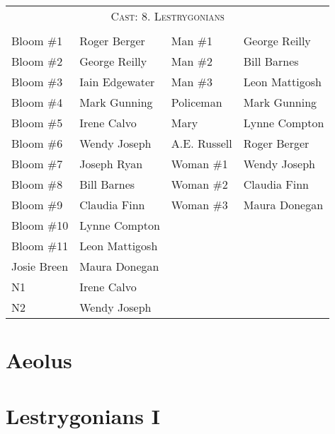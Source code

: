 \bigskip
\bigskip

\begin{tabular}{l p{5cm} l p{5cm}}
    \multicolumn{4}{c}{\Large \textsc{Cast: 8. Lestrygonians}} \\
\\
Bloom \#1           & Roger Berger          & Man \#1               & George Reilly \\
Bloom \#2           & George Reilly         & Man \#2               & Bill Barnes \\
Bloom \#3           & Iain Edgewater        & Man \#3               & Leon Mattigosh \\
Bloom \#4           & Mark Gunning          & Policeman             & Mark Gunning \\
Bloom \#5           & Irene Calvo           & Mary                  & Lynne Compton \\
Bloom \#6           & Wendy Joseph          & A.E. Russell          & Roger Berger \\
Bloom \#7           & Joseph Ryan           & Woman \#1             & Wendy Joseph \\
Bloom \#8           & Bill Barnes           & Woman \#2             & Claudia Finn \\
Bloom \#9           & Claudia Finn          & Woman \#3             & Maura Donegan \\
Bloom \#10          & Lynne Compton   \\
Bloom \#11          & Leon Mattigosh  \\
Josie Breen         & Maura Donegan   \\
N1                  & Irene Calvo     \\
N2                  & Wendy Joseph    \\

\end{tabular}
\thispagestyle{empty}

\newpage


\setcounter{page}{1}
\setcounter{section}{6}  %

\section{Aeolus}


\pagebreak

\section{Lestrygonians I}



